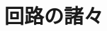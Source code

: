\documentclass[../../../all/physics-standard_answers_all.tex]{subfiles}
\begin{document}
\section{回路の諸々}
\end{document}
